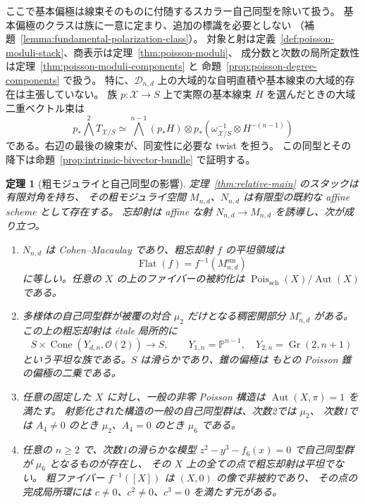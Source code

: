 \documentclass[a4paper,11pt]{ltjsarticle}
\numberwithin{equation}{section}
\theoremstyle{plain}
\newtheorem{theorem}{定理}[section]
\theoremstyle{definition}
\newcommand{\Gr}{\operatorname{Gr}}
\newcommand{\Pois}{\operatorname{Pois}}
\begin{document}
ここで基本偏極は線束そのものに付随するスカラー自己同型を除いて扱う。
基本偏極のクラスは族に一意に定まり、追加の標識を必要としない
（補題~\ref{lemma:fundamental-polarization-class}）。
対象と射は定義~\ref{def:poisson-moduli-stack}、商表示は定理~\ref{thm:poisson-moduli}、
成分数と次数の局所定数性は定理~\ref{thm:poisson-moduli-components} と
命題~\ref{prop:poisson-degree-components} で扱う。
特に、$\mathcal D_{n,d}$ 上の大域的な自明直積や基本線束の大域的存在は主張していない。
族 $p:\mathcal X\to S$ 上で実際の基本線束 $H$ を選んだときの大域二重ベクトル束は
\[
 p_*\bigwedge^2T_{\mathcal X/S}
 \simeq\bigwedge^{n-1}(p_*H)\otimes
 p_*(\omega_{\mathcal X/S}^{-1}\otimes H^{-(n-1)})
\]
である。右辺の最後の線束が、同変性に必要な twist を担う。
この同型とその降下は命題~\ref{prop:intrinsic-bivector-bundle} で証明する。

\begin{theorem}[粗モジュライと自己同型の影響]
\label{thm:coarse-main}
定理~\ref{thm:relative-main} のスタックは有限対角を持ち、
その粗モジュライ空間 $M_{n,d}$、$N_{n,d}$ は有限型の既約な affine scheme として存在する。
忘却射は affine な射 $N_{n,d}\to M_{n,d}$ を誘導し、次が成り立つ。
\begin{enumerate}
\item $N_{n,d}$ は Cohen--Macaulay であり、粗忘却射 $f$ の平坦領域は
\[
 \operatorname{Flat}(f)=f^{-1}(M_{n,d}^{\mathrm{sm}})
\]
に等しい。任意の $X$ の上のファイバーの被約化は
$\Pois_{\mathrm{sch}}(X)/\operatorname{Aut}(X)$ である。
\item 多様体の自己同型群が被覆の対合 $\mu_2$ だけとなる稠密開部分
$M_{n,d}^{\circ}$ がある。この上の粗忘却射は \'{e}tale 局所的に
\[
 S\times\operatorname{Cone}(Y_{d,n},\mathcal O(2))\longrightarrow S,
 \qquad
 Y_{1,n}=\mathbb P^{n-1},\quad Y_{2,n}=\Gr(2,n+1)
\]
という平坦な族である。$S$ は滑らかであり、錐の偏極は
もとの Poisson 錐の偏極の二乗である。
\item 任意の固定した $X$ に対し、一般の非零 Poisson 構造は
$\operatorname{Aut}(X,\pi)=1$ を満たす。
射影化された構造の一般の自己同型群は、次数2では $\mu_2$、
次数1では $A_4\ne0$ のとき $\mu_2$、$A_4=0$ のとき $\mu_6$ である。
\item 任意の $n\geq2$ で、次数1の滑らかな模型
$z^2-y^3-f_6(x)=0$ で自己同型群が $\mu_6$ となるものが存在し、
その $X$ 上の全ての点で粗忘却射は平坦でない。
粗ファイバー $f^{-1}([X])$ は $(X,0)$ の像で非被約であり、
その点の完成局所環には $c\ne0$、$c^2\ne0$、$c^3=0$ を満たす元がある。
\end{enumerate}
\end{theorem}
\end{document}

